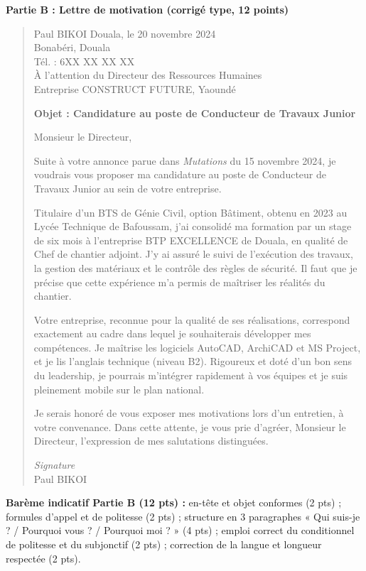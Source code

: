 \documentclass[11pt]{article}
\begin{document}
\begin{corrige}
\textbf{Partie B : Lettre de motivation (corrigé type, 12 points)}

\begin{quote}
Paul BIKOI \hfill Douala, le 20 novembre 2024\\
Bonabéri, Douala\\
Tél. : 6XX XX XX XX\\
À l'attention du Directeur des Ressources Humaines\\
Entreprise CONSTRUCT FUTURE, Yaoundé

\textbf{Objet : Candidature au poste de Conducteur de Travaux Junior}

Monsieur le Directeur,

Suite à votre annonce parue dans \emph{Mutations} du 15 novembre 2024, je voudrais vous proposer ma candidature au poste de Conducteur de Travaux Junior au sein de votre entreprise.

Titulaire d'un BTS de Génie Civil, option Bâtiment, obtenu en 2023 au Lycée Technique de Bafoussam, j'ai consolidé ma formation par un stage de six mois à l'entreprise BTP EXCELLENCE de Douala, en qualité de Chef de chantier adjoint. J'y ai assuré le suivi de l'exécution des travaux, la gestion des matériaux et le contrôle des règles de sécurité. Il faut que je précise que cette expérience m'a permis de maîtriser les réalités du chantier.

Votre entreprise, reconnue pour la qualité de ses réalisations, correspond exactement au cadre dans lequel je souhaiterais développer mes compétences. Je maîtrise les logiciels AutoCAD, ArchiCAD et MS Project, et je lis l'anglais technique (niveau B2). Rigoureux et doté d'un bon sens du leadership, je pourrais m'intégrer rapidement à vos équipes et je suis pleinement mobile sur le plan national.

Je serais honoré de vous exposer mes motivations lors d'un entretien, à votre convenance. Dans cette attente, je vous prie d'agréer, Monsieur le Directeur, l'expression de mes salutations distinguées.

\textit{Signature}\\
Paul BIKOI
\end{quote}

\textbf{Barème indicatif Partie B (12 pts) :} en-tête et objet conformes (2 pts) ; formules d'appel et de politesse (2 pts) ; structure en 3 paragraphes « Qui suis-je ? / Pourquoi vous ? / Pourquoi moi ? » (4 pts) ; emploi correct du conditionnel de politesse et du subjonctif (2 pts) ; correction de la langue et longueur respectée (2 pts).
\end{corrige}
\end{document}
